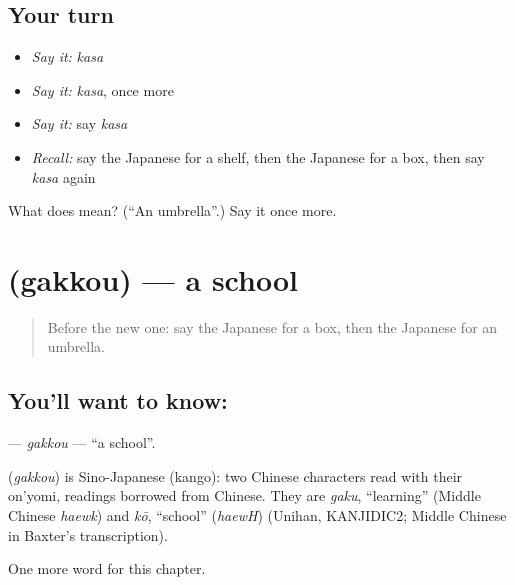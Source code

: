 \subsection*{Your turn}
\begin{itemize}
\raggedright
  \item \emph{Say it:} \emph{kasa}
  \item \emph{Say it:} \emph{kasa}, once more
  \item \emph{Say it:} say \emph{kasa}
  \item \emph{Recall:} say the Japanese for a shelf, then the Japanese for a box, then say \emph{kasa} again
\end{itemize}

\begin{tcolorbox}[breakable,colback=teal!4,colframe=teal!35!black,title={Before you move on}]
What does  mean? (\textquotedblleft{}An umbrella\textquotedblright{}.) Say it once more.
\end{tcolorbox}
\section[\texorpdfstring{\ja{がっこう} (gakkou)}{がっこう (gakkou)}]{ (gakkou) — a school}

\label{lesson:JA-C40-gakkou}



\begin{quote}
Before the new one: say the Japanese for a box, then the Japanese for an umbrella.
\end{quote}

\subsection*{You'll want to know: }
\textbf{} — \emph{gakkou} — \textquotedblleft{}a school\textquotedblright{}.

\begin{cousinweb}
\textbf{} (\emph{gakkou}) is Sino-Japanese (kango): two Chinese characters read with their on'yomi, readings borrowed from Chinese. They are \emph{gaku}, \textquotedblleft{}learning\textquotedblright{} (Middle Chinese \emph{haewk}) and \emph{kō}, \textquotedblleft{}school\textquotedblright{} (\emph{haewH}) (Unihan, KANJIDIC2; Middle Chinese in Baxter's transcription).
\end{cousinweb}

\begin{grammarlens}[title={What you've built}]
One more word for this chapter.
\end{grammarlens}

